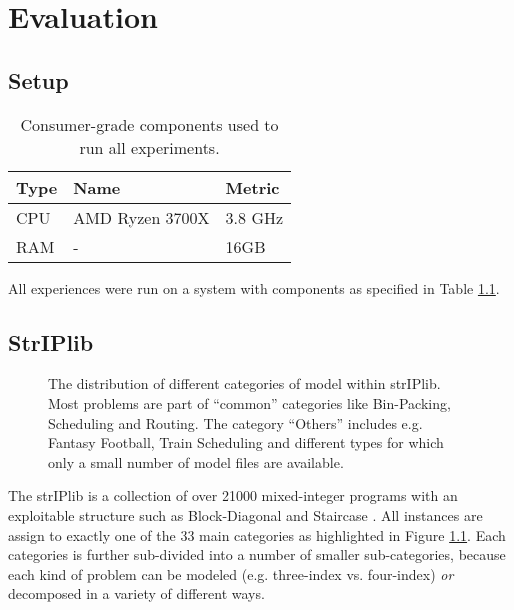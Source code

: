 \chapter{Evaluation}

	\section{Setup}
	
		\begin{table}[ht!]
			\centering
			\begin{tabular}{l|l|l}
				\textbf{Type} & \textbf{Name} & \textbf{Metric} \\
				\toprule
				\toprule
				CPU & AMD Ryzen 3700X & 3.8 GHz \\
				RAM & - & 16GB \\
			\end{tabular}
			\caption{Consumer-grade components used to run all experiments.}
			\label{table:eval:setup}
		\end{table}
		
		All experiences were run on a system with components as specified in Table \ref{table:eval:setup}.
		
		\clearpage
		

	\section{StrIPlib}
	
		\begin{figure}[ht!]
			\centering
			
			\caption{The distribution of different categories of model within \acs{strIPlib}. Most problems are part of \enquote{common} categories like Bin-Packing, Scheduling and Routing. The category \enquote{Others} includes e.g. Fantasy Football, Train Scheduling and different types for which only a small number of model files are available.}
			\label{fig:eval:striplib}
		\end{figure}
	
		The \acf{strIPlib} is a collection of over 21000 mixed-integer programs with an exploitable structure such as Block-Diagonal and Staircase .
		All instances are assign to exactly one of the 33 main categories as highlighted in Figure \ref{fig:eval:striplib}.
		Each categories is further sub-divided into a number of smaller sub-categories, because each kind of problem can be modeled (e.g. three-index vs. four-index) \textit{or} decomposed in a variety of different ways.
		
